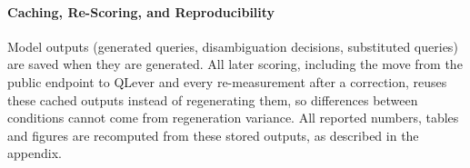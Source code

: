 \paragraph{Caching, Re-Scoring, and Reproducibility}

Model outputs (generated queries, disambiguation decisions, substituted queries) are saved when they are generated.
All later scoring, including the move from the public endpoint to QLever and every re-measurement after a correction, reuses these cached outputs instead of regenerating them, so differences between conditions cannot come from regeneration variance.
All reported numbers, tables and figures are recomputed from these stored outputs, as described in the appendix.
